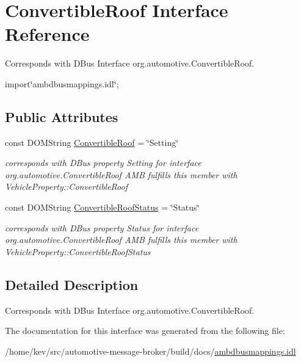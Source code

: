 \hypertarget{interfaceConvertibleRoof}{\section{Convertible\+Roof Interface Reference}
\label{interfaceConvertibleRoof}
}


Corresponds with D\+Bus Interface org.\+automotive.\+Convertible\+Roof.  




{\ttfamily import\char`\"{}ambdbusmappings.\+idl\char`\"{};}

\subsection*{Public Attributes}
\begin{DoxyCompactItemize}
\item 
\hypertarget{interfaceConvertibleRoof_a97b477822f789851b728735ad8122e6e}{const D\+O\+M\+String \hyperlink{interfaceConvertibleRoof_a97b477822f789851b728735ad8122e6e}{Convertible\+Roof} = \char`\"{}Setting\char`\"{}}\label{interfaceConvertibleRoof_a97b477822f789851b728735ad8122e6e}

\begin{DoxyCompactList}\small\item\em corresponds with D\+Bus property Setting for interface org.\+automotive.\+Convertible\+Roof A\+M\+B fulfills this member with Vehicle\+Property\+::\+Convertible\+Roof \end{DoxyCompactList}\item 
\hypertarget{interfaceConvertibleRoof_a4fc60cf509edfff9f45cf2d024ed4e86}{const D\+O\+M\+String \hyperlink{interfaceConvertibleRoof_a4fc60cf509edfff9f45cf2d024ed4e86}{Convertible\+Roof\+Status} = \char`\"{}Status\char`\"{}}\label{interfaceConvertibleRoof_a4fc60cf509edfff9f45cf2d024ed4e86}

\begin{DoxyCompactList}\small\item\em corresponds with D\+Bus property Status for interface org.\+automotive.\+Convertible\+Roof A\+M\+B fulfills this member with Vehicle\+Property\+::\+Convertible\+Roof\+Status \end{DoxyCompactList}\end{DoxyCompactItemize}


\subsection{Detailed Description}
Corresponds with D\+Bus Interface org.\+automotive.\+Convertible\+Roof. 

The documentation for this interface was generated from the following file\+:\begin{DoxyCompactItemize}
\item 
/home/kev/src/automotive-\/message-\/broker/build/docs/\hyperlink{ambdbusmappings_8idl}{ambdbusmappings.\+idl}\end{DoxyCompactItemize}
